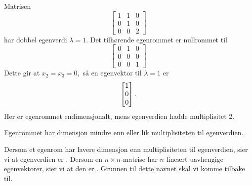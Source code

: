 \begin{ex}
Matrisen
\[
\begin{bmatrix}
1 & 1 & 0\\  0 &1 & 0 \\ 0 & 0 & 2
\end{bmatrix}
\]
har dobbel egenverdi $\lambda=1$. Det tilhørende egenrommet er nullrommet til 
\[
\begin{bmatrix}
0 & 1 & 0\\  0 &0 & 0 \\ 0 & 0 & 1
\end{bmatrix}
\]
%
Dette gir at
$
x_2=x_3=0,
$
så en egenvektor til $\lambda=1$ er
\[
 \begin{bmatrix} 1 \\ 0 \\ 0 \end{bmatrix}.
\]
Her er egenrommet endimensjonalt, mens egenverdien hadde multiplisitet 2.
\end{ex}


\begin{thm}
Egenrommet har dimensjon mindre enn eller lik multiplisiteten til egenverdien. 
\end{thm}

\noindent Dersom et egenrom har lavere dimensjon enn multiplisiteten til egenverdien, sier vi at egenverdien er . 
Dersom en $n\times n$-matrise har $n$ lineært uavhengige egenvektorer, sier vi at den er .
Grunnen til dette navnet skal vi komme tilbake til.





\kapittelslutt
